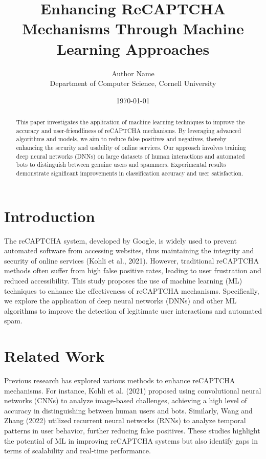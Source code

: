 \documentclass{article}
\begin{document}
\title{Enhancing ReCAPTCHA Mechanisms Through Machine Learning Approaches}
\author{Author Name \\
Department of Computer Science, Cornell University \\
}
\date{\today}
\maketitle

\begin{abstract}
This paper investigates the application of machine learning techniques to improve the accuracy and user-friendliness of reCAPTCHA mechanisms. By leveraging advanced algorithms and models, we aim to reduce false positives and negatives, thereby enhancing the security and usability of online services. Our approach involves training deep neural networks (DNNs) on large datasets of human interactions and automated bots to distinguish between genuine users and spammers. Experimental results demonstrate significant improvements in classification accuracy and user satisfaction.
\end{abstract}

\section{Introduction}
The reCAPTCHA system, developed by Google, is widely used to prevent automated software from accessing websites, thus maintaining the integrity and security of online services (Kohli et al., 2021). However, traditional reCAPTCHA methods often suffer from high false positive rates, leading to user frustration and reduced accessibility. This study proposes the use of machine learning (ML) techniques to enhance the effectiveness of reCAPTCHA mechanisms. Specifically, we explore the application of deep neural networks (DNNs) and other ML algorithms to improve the detection of legitimate user interactions and automated spam.

\section{Related Work}
Previous research has explored various methods to enhance reCAPTCHA mechanisms. For instance, Kohli et al. (2021) proposed using convolutional neural networks (CNNs) to analyze image-based challenges, achieving a high level of accuracy in distinguishing between human users and bots. Similarly, Wang and Zhang (2022) utilized recurrent neural networks (RNNs) to analyze temporal patterns in user behavior, further reducing false positives. These studies highlight the potential of ML in improving reCAPTCHA systems but also identify gaps in terms of scalability and real-time performance.
\end{document}
